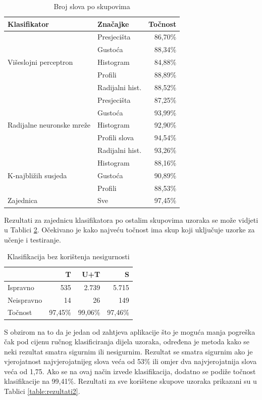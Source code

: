 \documentclass[a4paper,twocolumn,dvipdfm]{article}
\begin{document}
\begin{table}[htb]
\centering
\begin{tabular}{llr} \toprule
Klasifikator & Značajke & Točnost \\
\midrule
\multirow{5}{2cm}{Višeslojni perceptron}
 & Presjecišta & 86,70\% \\
 & Gustoća & 88,34\% \\
 & Histogram & 84,88\% \\
 & Profili & 88,89\% \\
 & Radijalni hist. & 88,52\% \\
\midrule
\multirow{5}{2cm}{Radijalne neuronske mreže}
 & Presjecišta & 87,25\% \\
 & Gustoća & 93,99\% \\
 & Histogram & 92,90\% \\
 & Profili slova & 94,54\% \\
 & Radijalni hist. & 93,26\% \\
\midrule
\multirow{3}{2cm}{K-najbližih susjeda}
 & Histogram & 88,16\% \\
 & Gustoća & 90,89\% \\
 & Profili & 88,53\% \\
\midrule
\multirow{1}{2cm}{Zajednica}
 & Sve & 97,45\% \\
\bottomrule
\end{tabular}
\caption{Broj slova po skupovima}
\label{table:rezPoKlasif}
\end{table}

Rezultati za zajednicu klasifikatora po ostalim skupovima uzoraka se može
vidjeti u Tablici \ref{table:rezultati}. Očekivano je kako najveću točnost ima
skup koji uključuje uzorke za učenje i testiranje.

\begin{table}[htb]
\centering
\begin{tabular}{lrrr} \toprule
 & T & U+T & S \\ \midrule
Ispravno & 535 & 2.739 & 5.715 \\
Neispravno & 14 & 26 & 149 \\
Točnost & 97,45\% & 99,06\% & 97,46\% \\ \bottomrule
\end{tabular}
\caption{Klasifikacija bez korištenja nesigurnosti}
\label{table:rezultati}
\end{table}

S obzirom na to da je jedan od zahtjeva aplikacije što je moguća manja pogreška
čak pod cijenu ručnog klasificiranja dijela uzoraka, određena je metoda
kako se neki rezultat smatra sigurnim ili nesigurnim. Rezultat se smatra
sigurnim ako je vjerojatnost najvjerojatnijeg slova veća od 53\% ili omjer dva
najvjerojatnija slova veća od 1,75. Ako se na ovaj način izvede klasifikacija,
dodatno se podiže točnost klasifikacije na 99,41\%. Rezultati za sve korištene
skupove uzoraka prikazani su u Tablici \ref{table:rezultati2}.
\end{document}
